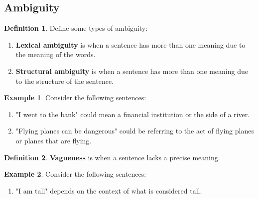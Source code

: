\documentclass{tufte-handout}
\theoremstyle{definition}
\newtheorem{defn}{Definition}
\theoremstyle{example}
\newtheorem{exmp}{Example}
\theoremstyle{remark}
\begin{document}
\subsection{Ambiguity}
\begin{defn}
  Define some types of ambiguity:
  \begin{enumerate}[leftmargin=3\parindent]
    \item \textbf{Lexical ambiguity} is when a sentence has more than one meaning due to the meaning of the words.
    \item \textbf{Structural ambiguity} is when a sentence has more than one meaning due to the structure of the sentence.
  \end{enumerate}
\end{defn}
\begin{exmp}
  Consider the following sentences:
  \begin{enumerate}[leftmargin=3\parindent]
    \item "I went to the bank" could mean a financial institution or the side of a river.
    \item "Flying planes can be dangerous" could be referring to the act of flying planes or planes that are flying.
  \end{enumerate}
\end{exmp}
\begin{defn}
  \textbf{Vagueness} is when a sentence lacks a precise meaning.
\end{defn}
\begin{exmp}
  Consider the following sentences:
  \begin{enumerate}[leftmargin=3\parindent]
    \item "I am tall" depends on the context of what is considered tall.
  \end{enumerate}
\end{exmp}
\end{document}
